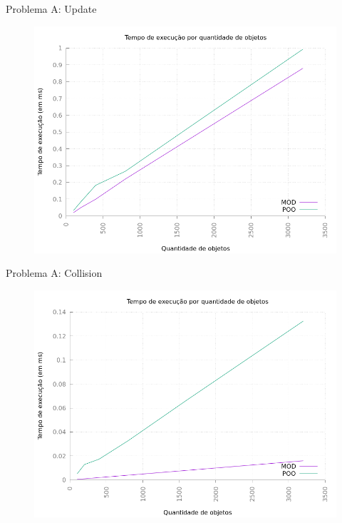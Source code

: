 \documentclass{beamer}
\begin{document}
\begin{frame}{Problema A: Update}
    \begin{figure}[h!]
        \centering
        \includegraphics[width =.8\textwidth]{figuras/updatev1graph}
        \par\medskip
    \end{figure}
\end{frame}

\begin{frame}{Problema A: Collision}
    \begin{figure}[h!]
        \centering
        \includegraphics[width =.8\textwidth]{figuras/colisionv1graph}
        \par\medskip
    \end{figure}
\end{frame}
\end{document}
